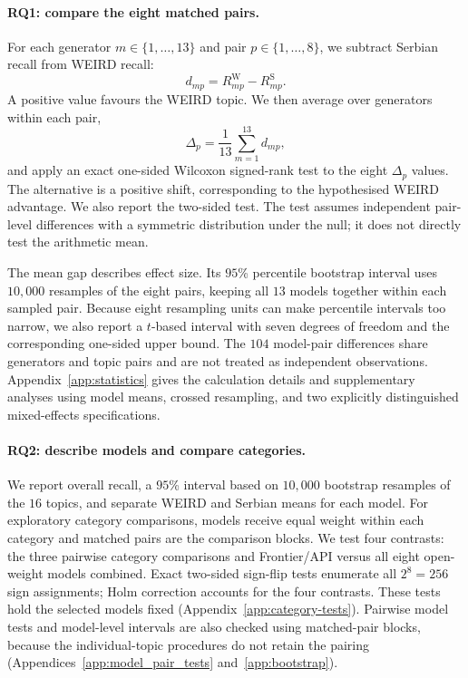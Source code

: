 \documentclass[11pt,a4paper]{article}
\begin{document}
\paragraph{RQ1: compare the eight matched pairs.}
For each generator $m\in\{1,\ldots,13\}$ and pair $p\in\{1,\ldots,8\}$, we subtract Serbian recall from WEIRD recall:
\begin{equation}
d_{mp}=R_{mp}^{\mathrm W}-R_{mp}^{\mathrm S}.
\label{eq:pair-gap}
\end{equation}
A positive value favours the WEIRD topic. We then average over generators within each pair,
\begin{equation}
\Delta_p=\frac{1}{13}\sum_{m=1}^{13}d_{mp},
\label{eq:pair-mean}
\end{equation}
and apply an exact one-sided Wilcoxon signed-rank test to the eight $\Delta_p$ values. The alternative is a positive shift, corresponding to the hypothesised WEIRD advantage. We also report the two-sided test. The test assumes independent pair-level differences with a symmetric distribution under the null; it does not directly test the arithmetic mean.

The mean gap describes effect size. Its $95$\% percentile bootstrap interval uses $10{,}000$ resamples of the eight pairs, keeping all $13$ models together within each sampled pair. Because eight resampling units can make percentile intervals too narrow, we also report a $t$-based interval with seven degrees of freedom and the corresponding one-sided upper bound. The $104$ model-pair differences share generators and topic pairs and are not treated as independent observations. Appendix~\ref{app:statistics} gives the calculation details and supplementary analyses using model means, crossed resampling, and two explicitly distinguished mixed-effects specifications.

\paragraph{RQ2: describe models and compare categories.}
We report overall recall, a $95$\% interval based on $10{,}000$ bootstrap resamples of the $16$ topics, and separate WEIRD and Serbian means for each model. For exploratory category comparisons, models receive equal weight within each category and matched pairs are the comparison blocks. We test four contrasts: the three pairwise category comparisons and Frontier/API versus all eight open-weight models combined. Exact two-sided sign-flip tests enumerate all $2^8=256$ sign assignments; Holm correction accounts for the four contrasts. These tests hold the selected models fixed (Appendix~\ref{app:category-tests}). Pairwise model tests and model-level intervals are also checked using matched-pair blocks, because the individual-topic procedures do not retain the pairing (Appendices~\ref{app:model_pair_tests} and~\ref{app:bootstrap}).
\end{document}
